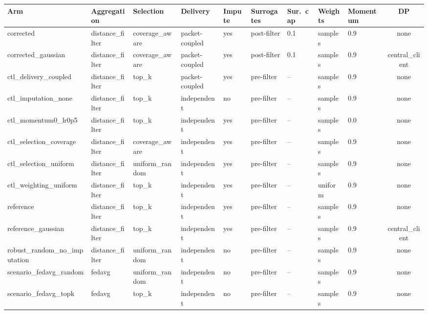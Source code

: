 \begin{tabular}{@{}lllllllllc@{}}\toprule
Arm & Aggregation & Selection & Delivery & Impute & Surrogates & Sur.\ cap & Weights & Momentum & DP\\\midrule
corrected & distance\_filter & coverage\_aware & packet-coupled & yes & post-filter & 0.1 & samples & 0.9 & none \\
corrected\_gaussian & distance\_filter & coverage\_aware & packet-coupled & yes & post-filter & 0.1 & samples & 0.9 & central\_client \\
ctl\_delivery\_coupled & distance\_filter & top\_k & packet-coupled & yes & pre-filter & -- & samples & 0.9 & none \\
ctl\_imputation\_none & distance\_filter & top\_k & independent & no & pre-filter & -- & samples & 0.9 & none \\
ctl\_momentum0\_lr0p5 & distance\_filter & top\_k & independent & yes & pre-filter & -- & samples & 0.0 & none \\
ctl\_selection\_coverage & distance\_filter & coverage\_aware & independent & yes & pre-filter & -- & samples & 0.9 & none \\
ctl\_selection\_uniform & distance\_filter & uniform\_random & independent & yes & pre-filter & -- & samples & 0.9 & none \\
ctl\_weighting\_uniform & distance\_filter & top\_k & independent & yes & pre-filter & -- & uniform & 0.9 & none \\
reference & distance\_filter & top\_k & independent & yes & pre-filter & -- & samples & 0.9 & none \\
reference\_gaussian & distance\_filter & top\_k & independent & yes & pre-filter & -- & samples & 0.9 & central\_client \\
robust\_random\_no\_imputation & distance\_filter & uniform\_random & independent & no & pre-filter & -- & samples & 0.9 & none \\
scenario\_fedavg\_random & fedavg & uniform\_random & independent & no & pre-filter & -- & samples & 0.9 & none \\
scenario\_fedavg\_topk & fedavg & top\_k & independent & no & pre-filter & -- & samples & 0.9 & none \\
\bottomrule\end{tabular}
